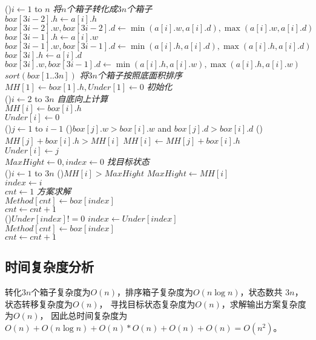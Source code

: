 \begin{algorithm}[htbp]
    \caption{$maxBoxHight(a[1..n])$}\label{algo:box}
    \For(){$i \leftarrow 1$ to $n$}{ \emph{将$n$个箱子转化成$3n$个箱子} \\
        $box[3i-2].h \leftarrow a[i].h$\\
        $box[3i-2].w, box[3i-2].d \leftarrow \min(a[i].w,a[i].d), \max(a[i].w, a[i].d)$\\
        $box[3i-1].h \leftarrow a[i].w$\\
        $box[3i-1].w, box[3i-1].d \leftarrow \min(a[i].h,a[i].d), \max(a[i].h, a[i].d)$\\
        $box[3i].h \leftarrow a[i].d$\\
        $box[3i].w, box[3i-1].d \leftarrow \min(a[i].h,a[i].w), \max(a[i].h, a[i].w)$\\
    }
    $sort(box[1..3n])$ \emph{将$3n$个箱子按照底面积排序} \\
    
    $MH[1] \leftarrow box[1].h, Under[1] \leftarrow 0$ \emph{初始化} \\
    \For(){$i \leftarrow 2$ to $3n$}{ \emph{自底向上计算} \\
        $MH[i] \leftarrow box[i].h$\\
        $Under[i] \leftarrow 0$\\
        \For(){$j \leftarrow 1$ to $i - 1$}{
            \If(){$box[j].w > box[i].w$ and $box[j].d > box[i].d$}{
                \If(){$MH[j] + box[i].h > MH[i]$}{
                    $MH[i] \leftarrow MH[j] + box[i].h$\\
                    $Under[i] \leftarrow j$\\
                }
            }
        }
    }
    $MaxHight \leftarrow 0, index \leftarrow 0$ \emph{找目标状态} \\
    \For(){$i \leftarrow 1$ to $3n$}{
        \If(){$MH[i] > MaxHight$}{
            $MaxHight \leftarrow MH[i]$\\
            $index \leftarrow i$\\
        }
    }
    $cnt \leftarrow 1$   \emph{方案求解}\\
    $Method[cnt] \leftarrow box[index]$\\
    $cnt \leftarrow cnt + 1$\\
    \While(){$Under[index] != 0$}{
        $index \leftarrow Under[index]$\\
        $Method[cnt] \leftarrow box[index]$\\
        $cnt \leftarrow cnt + 1$\\
    }
\end{algorithm}

\subsection{时间复杂度分析}
转化$3n$个箱子复杂度为$O(n)$，排序箱子复杂度为$O(n \log n)$，状态数共 $3n$，状态转移复杂度为$O(n)$， 寻找目标状态复杂度为$O(n)$，求解输出方案复杂度为$O(n)$，
因此总时间复杂度为$O(n) + O(n\log n) + O(n) * O(n) + O(n) + O(n) = O(n^2)$。